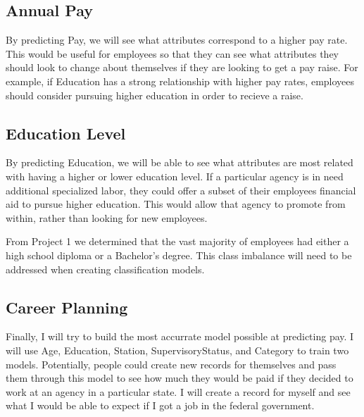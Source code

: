 \documentclass{article}
\begin{document}
    \subsection{Annual Pay}
    By predicting Pay, we will see what attributes correspond to a higher pay rate. This would be useful for employees so that they can see what attributes they should look to change about themselves if they are looking to get a pay raise. For example, if Education has a strong relationship with higher pay rates, employees should consider pursuing higher education in order to recieve a raise.

    \subsection{Education Level}
    By predicting Education, we will be able to see what attributes are most related with having a higher or lower education level. If a particular agency is in need additional specialized labor, they could offer a subset of their employees financial aid to pursue higher education. This would allow that agency to promote from within, rather than looking for new employees.
    \par
    From Project 1 we determined that the vast majority of employees had either a high school diploma or a Bachelor's degree. This class imbalance will need to be addressed when creating classification models.\cite{proj1}

    \subsection{Career Planning}
    Finally, I will try to build the most accurrate model possible at predicting pay. I will use Age, Education, Station, SupervisoryStatus, and Category to train two models. Potentially, people could create new records for themselves and pass them through this model to see how much they would be paid if they decided to work at an agency in a particular state. I will create a record for myself and see what I would be able to expect if I got a job in the federal government.
\end{document}
